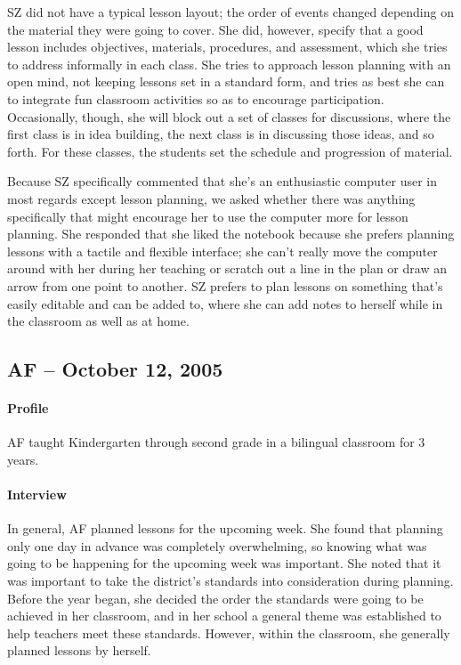 \documentclass[12pt,titlepage]{article}
\begin{document}
SZ did not have a typical lesson layout; the order of events changed depending
on the material they were going to cover.  She did, however, specify that a good
lesson includes objectives, materials, procedures, and assessment, which she
tries to address informally in each class.  She tries to approach lesson
planning with an open mind, not keeping lessons set in a standard form, and
tries as best she can to integrate fun classroom activities so as to encourage
participation.  Occasionally, though, she will block out a set of classes for
discussions, where the first class is in idea building, the next class is in
discussing those ideas, and so forth.  For these classes, the students set the
schedule and progression of material.

Because SZ specifically commented that she's an enthusiastic computer user in
most regards except lesson planning, we asked whether there was anything
specifically that might encourage her to use the computer more for lesson
planning.  She responded that she liked the notebook because she prefers
planning lessons with a tactile and flexible interface; she can't really move
the computer around with her during her teaching or scratch out a line in the
plan or draw an arrow from one point to another.  SZ prefers to plan lessons on
something that's easily editable and can be added to, where she can add notes to
herself while in the classroom as well as at home.

\subsection{AF -- October 12, 2005}
\paragraph{Profile} AF taught Kindergarten through second grade in a bilingual
classroom for 3 years.

\paragraph{Interview}In general, AF planned lessons for the upcoming week.  She
found that planning only one day in advance was completely overwhelming, so
knowing what was going to be happening for the upcoming week was important.  She
noted that it was important to take the district's standards into consideration
during planning.  Before the year began, she decided the order the standards
were going to be achieved in her classroom, and in her school a general theme
was established to help teachers meet these standards.  However, within the
classroom, she generally planned lessons by herself.
\end{document}
